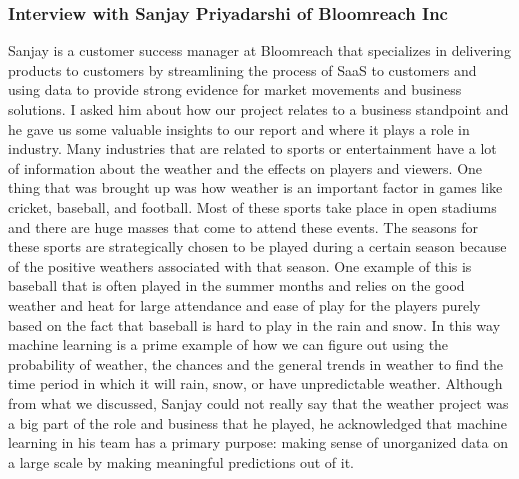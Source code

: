 \documentclass[10pt]{article}
\begin{document}
\subsubsection*{Interview with Sanjay Priyadarshi of Bloomreach Inc}
Sanjay is a customer success manager at Bloomreach that specializes in delivering products to customers by streamlining the process of SaaS to customers and using data to provide strong evidence for market movements and business solutions. I asked him about how our project relates to a business standpoint and he gave us some valuable insights to our report and where it plays a role in industry. Many industries that are related to sports or entertainment have a lot of information about the weather and the effects on players and viewers. One thing that was brought up was how weather is an important factor in games like cricket, baseball, and football. Most of these sports take place in open stadiums and there are huge masses that come to attend these events. The seasons for these sports are strategically chosen to be played during a certain season because of the positive weathers associated with that season. One example of this is baseball that is often played in the summer months and relies on the good weather and heat for large attendance and ease of play for the players purely based on the fact that baseball is hard to play in the rain and snow. In this way machine learning is a prime example of how we can figure out using the probability of weather, the chances and the general trends in weather to find the time period in which it will rain, snow, or have unpredictable weather. Although from what we discussed, Sanjay could not really say that the weather project was a big part of the role and business that he played, he acknowledged that machine learning in his team has a primary purpose: making sense of unorganized data on a large scale by making meaningful predictions out of it.
\end{document}
